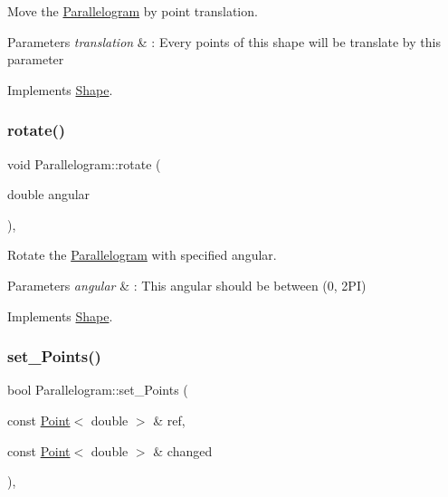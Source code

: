 Move the \hyperlink{classParallelogram}{Parallelogram} by point translation. 


\begin{DoxyParams}{Parameters}
{\em translation} & \+: Every points of this shape will be translate by this parameter \\
\hline
\end{DoxyParams}


Implements \hyperlink{classShape_a1f447acd6219cb10b9b7a40371519c46}{Shape}.

\mbox{\label{classParallelogram_ac498f6a15dea236ecc49bece023d17b0}} 
\subsubsection{\texorpdfstring{rotate()}{rotate()}}
{\footnotesize\ttfamily void Parallelogram\+::rotate (\begin{DoxyParamCaption}\item[{double}]{angular }\end{DoxyParamCaption})\hspace{0.3cm}{\ttfamily [override]}, {\ttfamily [virtual]}}



Rotate the \hyperlink{classParallelogram}{Parallelogram} with specified angular. 


\begin{DoxyParams}{Parameters}
{\em angular} & \+: This angular should be between (0, 2\+PI) \\
\hline
\end{DoxyParams}


Implements \hyperlink{classShape_a2dea8616fd40f2d69fd208715921982a}{Shape}.

\mbox{\label{classParallelogram_ab74583703a60e4b798d7048aa684f44e}} 
\subsubsection{\texorpdfstring{set\+\_\+\+Points()}{set\_Points()}}
{\footnotesize\ttfamily bool Parallelogram\+::set\+\_\+\+Points (\begin{DoxyParamCaption}\item[{const \hyperlink{classPoint}{Point}$<$ double $>$ \&}]{ref,  }\item[{const \hyperlink{classPoint}{Point}$<$ double $>$ \&}]{changed }\end{DoxyParamCaption})\hspace{0.3cm}{\ttfamily [override]}, {\ttfamily [virtual]}}



